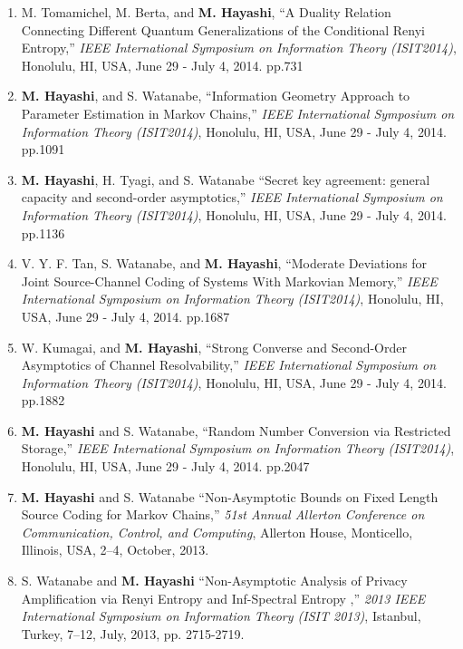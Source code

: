 \documentclass[a4paper,12pt,oneside]{article}
\begin{document}
\begin{enumerate}
    \item
    M. Tomamichel, M. Berta, and \textbf{M. Hayashi}, 
    ``A Duality Relation Connecting Different Quantum Generalizations of the Conditional Renyi Entropy,'' 
    {\em IEEE International Symposium on Information Theory (ISIT2014)}, 
    Honolulu, HI, USA, June 29 - July 4, 2014. pp.731
    
    \item
    \textbf{M. Hayashi}, and S. Watanabe, 
    ``Information Geometry Approach to Parameter Estimation in Markov Chains,'' {\em IEEE International Symposium on Information Theory (ISIT2014)}, Honolulu, HI, USA, June 29 - July 4, 2014. pp.1091
    
    \item
    \textbf{M. Hayashi}, H. Tyagi, and S. Watanabe 
    ``Secret key agreement: general capacity and second-order asymptotics,'' 
    {\em IEEE International Symposium on Information Theory (ISIT2014)}, Honolulu, HI, USA, June 29 - July 4, 2014. pp.1136
    
    \item
    V. Y. F. Tan, S. Watanabe, and \textbf{M. Hayashi}, 
    ``Moderate Deviations for Joint Source-Channel Coding of Systems With Markovian Memory,'' 
    {\em IEEE International Symposium on Information Theory (ISIT2014)}, Honolulu, HI, USA, June 29 - July 4, 2014. pp.1687
    
    \item
    W. Kumagai, and \textbf{M. Hayashi}, 
    ``Strong Converse and Second-Order Asymptotics of Channel Resolvability,''
    {\em IEEE International Symposium on Information Theory (ISIT2014)}, Honolulu, HI, USA, June 29 - July 4, 2014. pp.1882
    
    \item
    \textbf{M. Hayashi} and S. Watanabe, 
    ``Random Number Conversion via Restricted Storage,'' 
    {\em IEEE International Symposium on Information Theory (ISIT2014)}, Honolulu, HI, USA, June 29 - July 4, 2014. pp.2047
    
    \item
    \textbf{M. Hayashi} and S. Watanabe
    ``Non-Asymptotic Bounds on Fixed Length Source Coding for Markov Chains,''
    {\em 51st Annual Allerton Conference on Communication, Control, and Computing}, 
    Allerton House, Monticello, Illinois, USA, 2--4, October, 2013.
    
    \item
    S. Watanabe and \textbf{M. Hayashi}
    ``Non-Asymptotic Analysis of Privacy Amplification via Renyi Entropy and Inf-Spectral Entropy ,'' 
    {\em 2013 IEEE International Symposium on Information Theory (ISIT 2013)}, 
    Istanbul, Turkey, 7--12, July, 2013, pp. 2715-2719.
    

\end{enumerate}
\end{document}
